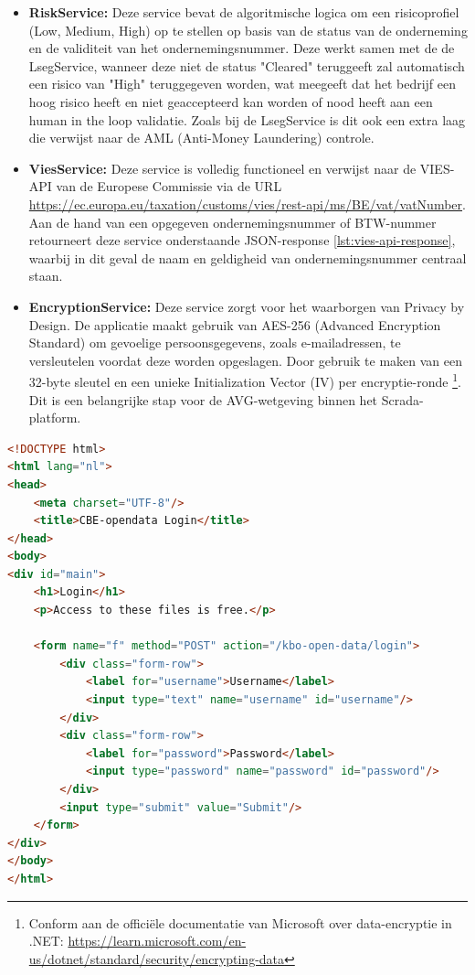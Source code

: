 \begin{itemize}
    om extra veiligheid te garanderen bij het registreren van bedrijven.
    \item \textbf{RiskService:} Deze service bevat de algoritmische logica om een risicoprofiel (Low, Medium, High) op te stellen op basis van de status van de onderneming en de validiteit van het ondernemingsnummer. Deze werkt samen met
    de de LsegService, wanneer deze niet de status "Cleared" teruggeeft zal automatisch een risico van "High" teruggegeven worden, wat meegeeft dat het bedrijf een hoog risico heeft en niet geaccepteerd kan worden of nood heeft aan een human in the loop validatie.
    Zoals bij de LsegService is dit ook een extra laag die verwijst naar de AML (Anti-Money Laundering) controle.
    \item \textbf{ViesService:} Deze service is volledig functioneel en verwijst naar de VIES-API van de Europese Commissie via de URL \url{https://ec.europa.eu/taxation/customs/vies/rest-api/ms/BE/vat/vatNumber}. Aan de hand van een opgegeven ondernemingsnummer of BTW-nummer retourneert deze service onderstaande JSON-response \ref{lst:vies-api-response}, waarbij in dit geval de naam en geldigheid van ondernemingsnummer centraal staan.
    \item \textbf{EncryptionService:} Deze service zorgt voor het waarborgen van Privacy by Design. De applicatie maakt gebruik van AES-256 (Advanced Encryption \\ Standard) om gevoelige persoonsgegevens, zoals e-mailadressen, te versleutelen voordat deze worden opgeslagen. 
    Door gebruik te maken van een 32-byte sleutel en een unieke Initialization Vector (IV) per encryptie-ronde \footnote{Conform aan de officiële documentatie van Microsoft over data-encryptie in .NET: \url{https://learn.microsoft.com/en-us/dotnet/standard/security/encrypting-data}}. \\ Dit is een belangrijke stap voor de AVG-wetgeving binnen het Scrada-platform.

\end{itemize}  

\begin{listing}[ht]
\begin{lstlisting}[language=html, basicstyle=\tiny\ttfamily, breaklines=true, frame=lines]
<!DOCTYPE html>
<html lang="nl">
<head>
    <meta charset="UTF-8"/>
    <title>CBE-opendata Login</title>
</head>
<body>
<div id="main">
    <h1>Login</h1>
    <p>Access to these files is free.</p>

    <form name="f" method="POST" action="/kbo-open-data/login">
        <div class="form-row">
            <label for="username">Username</label>
            <input type="text" name="username" id="username"/>
        </div>
        <div class="form-row">
            <label for="password">Password</label>
            <input type="password" name="password" id="password"/>
        </div>
        <input type="submit" value="Submit"/>
    </form>
</div>
</body>
</html>
\end{lstlisting}
\caption{Volledige HTML-broncode van de KBO Public Search login pagina.}
\label{lst:kbo-full-html}
\end{listing}

